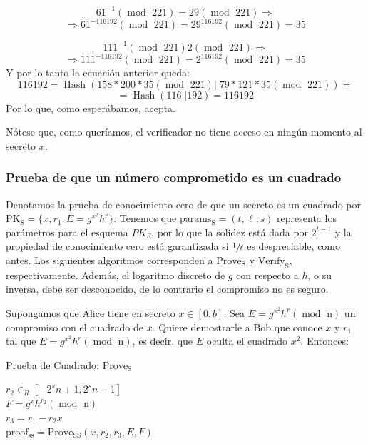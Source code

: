 $$61^{-1} (\operatorname{mod} \text{ 221}) = 29 (\operatorname{mod} \text{ 221}) \Rightarrow$$ $$\Rightarrow 61^{-116192} (\operatorname{mod} \text{ 221}) = 29^{116192} (\operatorname{mod} \text{ 221}) = 35$$

$$111^{-1} (\operatorname{mod} \text{ 221}) 2 (\operatorname{mod} \text{ 221}) \Rightarrow$$ $$\Rightarrow 111^{-116192} (\operatorname{mod} \text{ 221}) = 2^{116192} (\operatorname{mod} \text{ 221}) = 35$$
Y por lo tanto la ecuación anterior queda:
$$ 116192 = \operatorname{Hash}(158*200*35 (\operatorname{mod} \text{ 221})|| 79*121*35 (\operatorname{mod} \text{ 221})) = $$
$$ = \operatorname{Hash}(116||192) = 116192$$
Por lo que, como esperábamos, acepta.

Nótese que, como queríamos, el verificador no tiene acceso en ningún momento al secreto $x$.

\subsubsection{Prueba de que un número comprometido es un cuadrado}  \label{proof:s}

Denotamos la prueba de conocimiento cero de que un secreto es un cuadrado por $\operatorname{PK_{S}} = \{x, r_{1}: E = g^{x^{2}} h^{r}\}$. Tenemos que $\operatorname{params_{S}} = (t, \ell, s)$ representa los parámetros para el esquema $PK_{S}$, por lo que la solidez está dada por $2^{t-1}$ y la propiedad de conocimiento cero está garantizada si $\sfrac{1}{\ell}$ es despreciable, como antes. Los siguientes algoritmos corresponden a $\operatorname{Prove_{S}}$ y $\operatorname{Verify_{S}}$, respectivamente. Además, el logaritmo discreto de $g$ con respecto a $h$, o su inversa, debe ser desconocido, de lo contrario el compromiso no es seguro.

Supongamos que Alice tiene en secreto $x \in [0, b]$. Sea $E = g^{x^{2}} h^{r} (\operatorname{mod} \text{ n})$ un compromiso con el cuadrado de $x$. Quiere demostrarle a Bob que conoce $x$ y $r_{1}$ tal que $E = g^{x^{2}} h^{r} (\operatorname{mod} \text{ n})$, es decir, que $E$ oculta el cuadrado $x^{2}$. Entonces: \\
\begin{minipage}{0.9\textwidth}
    \begin{algorithm}[H] \label{alg:prove s}
        \caption{Prueba de Cuadrado: $\operatorname{Prove_{S}}$}

        $r_{2} \in_{R} [-2^{s}n+1, 2^{s}n-1]$ \\
        $F = g^{x}h^{r_{2}} (\operatorname{mod} \text{ n})$ \\
        $r_{3} = r_{1} - r_{2}x$ \\
        $\operatorname{proof_{ss}} = \operatorname{Prove_{SS}}(x, r_{2}, r_{3}, E, F)$ \\

    \end{algorithm}
\end{minipage}

